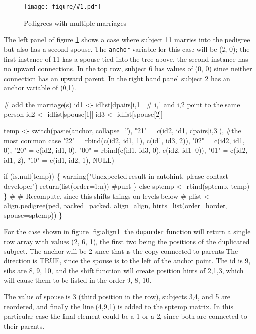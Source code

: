 \documentclass{article}
\newcommand{\myfig}[1]{\resizebox{\textwidth}{!}
                        {\texttt{[image: figure/\#1.pdf]}}}
\begin{document}
\begin{enumerate}
\begin{figure}
  \myfig{autohint3}
  \caption{Pedigrees with multiple marriages}
  \label{fig:auto3}
  \end{figure}

The left panel of figure \ref{fig:auto3} shows a case where
subject 11 marries into the pedigree but also has a second spouse.
The {\tt{}anchor} variable for
this case will be (2, 0); the first instance of 11 has a spouse tied
into the tree above, the second instance has no upward connections.
In the top row, subject 6 has values of (0, 0) since neither 
connection has an upward parent.  
In the right hand panel subject 2 has an anchor variable of (0,1).

\nwenddocs{}\plusendmoddef
        # add the marriage(s)
        id1 <- idlist[dpairs[i,1]]  # i,1 and i,2 point to the same person
        id2 <- idlist[spouse[1]]
        id3 <- idlist[spouse[2]]

        temp <- switch(paste(anchor, collapse=''),
                       "21" = c(id2, id1, dpairs[i,3]),   #the most common case
                       "22" = rbind(c(id2, id1, 1), c(id1, id3, 2)),
                       "02" = c(id2, id1, 0), 
                       "20" = c(id2, id1, 0), 
                       "00" = rbind(c(id1, id3, 0), c(id2, id1, 0)),
                       "01" = c(id2, id1, 2),
                       "10" = c(id1, id2, 1),
                       NULL)

        if (is.null(temp)) \{ 
            warning("Unexpected result in autohint, please contact developer")
            return(list(order=1:n))  #punt
          \}         
        else sptemp <- rbind(sptemp, temp)
        \}
    #
    # Recompute, since this shifts things on levels below
    #
    plist <- align.pedigree(ped, packed=packed, align=align, 
                            hints=list(order=horder, spouse=sptemp))   
    \}
\nwendcode{}\nwdocspar

For the case shown in figure \ref{fig:align1} the {\tt{}duporder} function
will return a single row array with values (2, 6, 1), the first two
being the positions of the duplicated subject.  
The anchor will be 2 since that is the copy connected to parents
The direction is TRUE, since the spouse is to the left of the anchor point.
The id is 9, sibs are 8, 9, 10, and the shift function will create position
hints of 2,1,3, which will cause them to be listed in the order 9, 8, 10.

The value of spouse is 3 (third position in the row), subjects 3,4, and 5
are reordered, and finally the line (4,9,1) is added to the sptemp 
matrix.  
In this particular case the final element could be a 1 or a 2, since both
are connected to their parents.


\end{enumerate}
\end{document}

